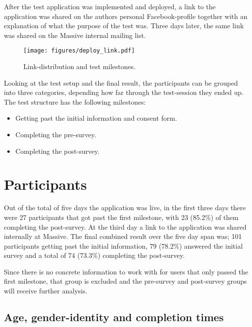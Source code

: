 After the test application was implemented and deployed, a link to the
application was shared on the authors personal Facebook-profile together
with an explanation of what the purpose of the test was. Three days
later, the same link was shared on the Massive internal mailing list.

\begin{figure}[h!]
  \centering
  \texttt{[image: figures/deploy\_link.pdf]}
  \caption{Link-distribution and test milestones.}
  \label{label_milestones}
\end{figure}

Looking at the test setup and the final result, the participants can be
grouped into three categories, depending how far through the test-session
they ended up. The test structure has the following milestones:
\begin{itemize}
  \item{Getting past the initial information and consent form.}
  \item{Completing the pre-survey.}
  \item{Completing the post-survey.}
\end{itemize}

\section{Participants}


Out of the total of five days the application was live, in the first
three days there were 27 participants that got past the first milestone,
with 23 (85.2\%) of them completing the post-survey. At the third day a
link to the application was shared internally at Massive. The final
combined result over the five day span was; 101 participants getting past
the initial information, 79 (78.2\%) answered the initial survey and a
total of 74 (73.3\%) completing the post-survey.

Since there is no concrete information to work with for users that only
passed the first milestone, that group is excluded and the pre-survey and
post-survey groups will receive further analysis.

  \subsection{Age, gender-identity and completion times}

